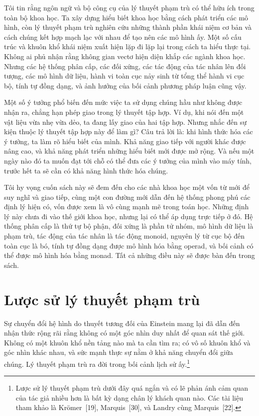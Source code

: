 Tôi tin rằng ngôn ngữ và bộ công cụ của lý thuyết phạm trù có thể hữu ích trong toàn bộ khoa học. Ta xây dựng hiểu biết khoa học bằng cách phát triển các mô hình, còn lý thuyết phạm trù nghiên cứu những thành phần khái niệm cơ bản và cách chúng kết hợp mạch lạc với nhau để tạo nên các mô hình ấy. Một số cấu trúc và khuôn khổ khái niệm xuất hiện lặp đi lặp lại trong cách ta hiểu thực tại. Không ai phủ nhận rằng không gian vectơ hiện diện khắp các ngành khoa học. Nhưng các hệ thống phân cấp, các đối xứng, các tác động của tác nhân lên đối tượng, các mô hình dữ liệu, hành vi toàn cục nảy sinh từ tổng thể hành vi cục bộ, tính tự đồng dạng, và ảnh hưởng của bối cảnh phương pháp luận cũng vậy.

Một số ý tưởng phổ biến đến mức việc ta sử dụng chúng hầu như không được nhận ra, chẳng hạn phép giao trong lý thuyết tập hợp. Ví dụ, khi nói đến một vật liệu vừa nhẹ vừa dẻo, ta đang lấy giao của hai tập hợp. Nhưng nhắc đến sự kiện thuộc lý thuyết tập hợp này để làm gì? Câu trả lời là: khi hình thức hóa các ý tưởng, ta làm rõ hiểu biết của mình. Khả năng giao tiếp với người khác được nâng cao, và khả năng
phát triển những hiểu biết mới được mở rộng. Và nếu một ngày nào đó ta muốn đạt tới chỗ có thể đưa các ý tưởng của mình vào máy tính, trước hết ta sẽ cần có khả năng hình thức hóa chúng.

Tôi hy vọng cuốn sách này sẽ đem đến cho các nhà khoa học một vốn từ mới để suy nghĩ và giao tiếp, cùng một con đường mới dẫn đến hệ thống phong phú các định lý hiện có, vốn được xem là vô cùng mạnh mẽ trong toán học. Những định lý này chưa đi vào thế giới khoa học, nhưng lại có thể áp dụng trực tiếp ở đó. Hệ thống phân cấp là thứ tự bộ phận, đối xứng là phần tử nhóm, mô hình dữ liệu là phạm trù, tác động của tác nhân là tác động monoid, nguyên lý từ cục bộ đến toàn cục là bó, tính tự đồng dạng được mô hình hóa bằng operad, và bối cảnh có thể được mô hình hóa bằng monad. Tất cả những điều này sẽ được bàn đến trong sách.

\section{Lược sử lý thuyết phạm trù}

Sự chuyển đổi hệ hình do thuyết tương đối của Einstein mang lại đã dẫn đến nhận thức rộng rãi rằng không có một góc nhìn duy nhất để quan sát thế giới. Không có một khuôn khổ nền tảng nào mà ta cần tìm ra; có vô số khuôn khổ và góc nhìn khác nhau, và sức mạnh thực sự nằm ở khả năng chuyển đổi giữa chúng. Lý thuyết phạm trù ra đời trong bối cảnh lịch sử ấy.\footnote{Lược sử lý thuyết phạm trù dưới đây quá ngắn và có lẽ phản ánh cảm quan của tác giả nhiều hơn là bất kỳ dạng chân lý khách quan nào. Các tài liệu tham khảo là Krömer~[19], Marquis~[30], và Landry cùng Marquis~[22].}


